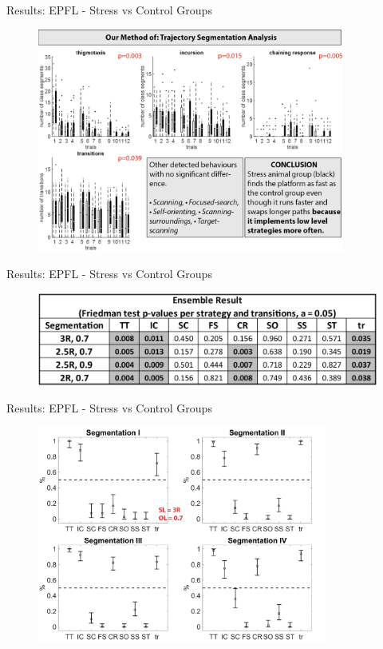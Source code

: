 \documentclass{beamer}
\begin{document}
{\begin{frame}{Results: EPFL - Stress vs Control Groups}
	\begin{figure}[H]
		\centering
		\includegraphics[width=0.9\textwidth]{figures/res3}
	\end{figure}
	\vspace{15mm}
\end{frame}

\begin{frame}{Results: EPFL - Stress vs Control Groups}
	\begin{figure}[H]
		\centering
		\includegraphics[width=\textwidth]{figures/res5}
	\end{figure}
	\vspace{15mm}
\end{frame}

\begin{frame}{Results: EPFL - Stress vs Control Groups}
	\begin{figure}[H]
		\centering
		\includegraphics[width=0.85\textwidth]{figures/res4}
	\end{figure}
	\vspace{15mm}
\end{frame}

}
\end{document}
